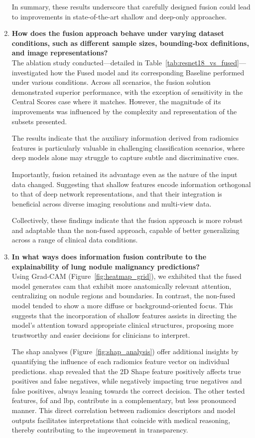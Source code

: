 \begin{enumerate}
In summary, these results underscore that carefully designed fusion could lead to improvements in state-of-the-art shallow and deep-only approaches.

  
  \item \textbf{How does the fusion approach behave under varying dataset conditions, such as different sample sizes, bounding‐box definitions, and image representations?}\\
The ablation study conducted—detailed in Table~\ref{tab:resnet18_vs_fused}—investigated how the Fused model and its corresponding Baseline performed under various conditions. Across all scenarios, the fusion solution demonstrated superior performance, with the exception of sensitivity in the Central Scores case where it matches. However, the magnitude of its improvements was influenced by the complexity and representation of the subsets presented.

The results indicate that the auxiliary information derived from radiomics features is particularly valuable in challenging classification scenarios, where deep models alone may struggle to capture subtle and discriminative cues.

Importantly, fusion retained its advantage even as the nature of the input data changed. Suggesting that shallow features encode information orthogonal to that of deep network representations, and that their integration is beneficial across diverse imaging resolutions and multi-view data. 

Collectively, these findings indicate that the fusion approach is more robust and adaptable than the non-fused approach, capable of better generalizing across a range of clinical data conditions.
  
  \item \textbf{In what ways does information fusion contribute to the explainability of lung nodule malignancy predictions?}\\
Using Grad-CAM (Figure~\ref{fig:heatmap_grid}), we exhibited that the fused model generates \ac{cam} that exhibit more anatomically relevant attention, centralizing on nodule regions and boundaries. In contrast, the non-fused model tended to show a more diffuse or background-oriented focus. This suggests that the incorporation of shallow features assists in directing the model’s attention toward appropriate clinical structures, proposing more trustworthy and easier decisions for clinicians to interpret.

The \ac{shap} analyses (Figure~\ref{fig:shap_analysis}) offer additional insights by quantifying the influence of each radiomics feature vector on individual predictions. \ac{shap} revealed that the 2D Shape feature positively affects true positives and false negatives, while negatively impacting true negatives and false positives, always leaning towards the correct decision. The other tested features, \ac{fof} and \ac{lbp}, contribute in a complementary, but less pronounced manner.
This direct correlation between radiomics descriptors and model outputs facilitates interpretations that coincide with medical reasoning, thereby contributing to the improvement in transparency.


\end{enumerate}
